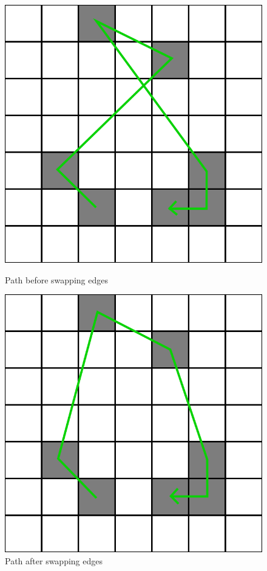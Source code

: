 \documentclass[titlepage]{article}
\newcommand{\multifigcaption}{\captionsetup{justification=justified}}
\begin{document}
\begin{figure}[H]
	\begin{center}
		\begin{minipage}{.45\linewidth}
			\includegraphics[width=\textwidth]{img/twoopt/path1.png}
			\multifigcaption
			\caption{Path before swapping edges}
			\label{img:twoopt/path1}
		\end{minipage}
		\hspace{.05\linewidth}
		\begin{minipage}{.45\linewidth}
			\includegraphics[width=\textwidth]{img/twoopt/path2.png}
			\multifigcaption
			\caption{Path after swapping edges}
			\label{img:twoopt/path2}
			
		\end{minipage}
	\end{center}
\end{figure}
\end{document}
